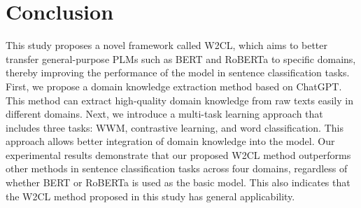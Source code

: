 \section{Conclusion}
\label{sec:con}
This study proposes a novel framework called W2CL, which aims to better transfer general-purpose PLMs such as BERT and RoBERTa to specific domains, thereby improving the performance of the model in sentence classification tasks. First, we propose a domain knowledge extraction method based on ChatGPT. This method can extract high-quality domain knowledge from raw texts easily in different domains. Next, we introduce a multi-task learning approach that includes three tasks: WWM, contrastive learning, and word classification. This approach allows better integration of domain knowledge into the model. Our experimental results demonstrate that our proposed W2CL method outperforms other methods in sentence classification tasks across four domains, regardless of whether BERT or RoBERTa is used as the basic model. This also indicates that the W2CL method proposed in this study has general applicability.
